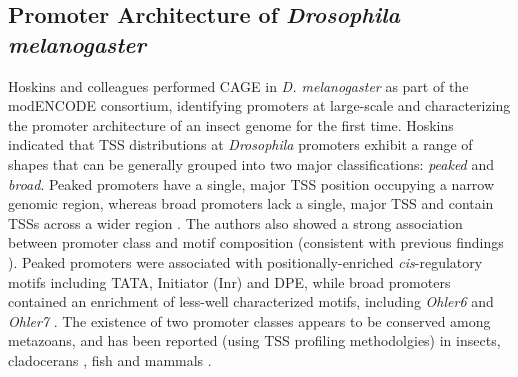 \documentclass[runningheads,a4paper]{llncs}
\begin{document}
\begin{linenumbers}
\subsection{Promoter Architecture of \textit{Drosophila melanogaster}}
Hoskins and colleagues \cite{Hoskins:2011io} performed CAGE in \textit{D. melanogaster} as part of the modENCODE consortium, identifying promoters at large-scale and characterizing the promoter architecture of an insect genome for the first time.
Hoskins \cite{Hoskins:2011io} indicated that TSS distributions at \textit{Drosophila} promoters exhibit a range of shapes that can be generally grouped into two major classifications: \textit{peaked} and \textit{broad}. 
Peaked promoters have a single, major TSS position occupying a narrow genomic region, whereas broad promoters lack a single, major TSS and contain TSSs across a wider region \cite{Rach:2009ct,Lenhard:2012en}. 
The authors also showed a strong association between promoter class and motif composition (consistent with previous findings \cite{Rach:2009ct,Ni:2010jh}). 
Peaked promoters were associated with positionally-enriched \textit{cis}-regulatory motifs including TATA, Initiator (Inr) and DPE, while broad promoters contained an enrichment of less-well characterized motifs, including \textit{Ohler6} and \textit{Ohler7} \cite{Ohler:2002vl}. 
The existence of two promoter classes appears to be conserved among metazoans, and has been reported (using TSS profiling methodolgies) in insects, cladocerans \cite{Raborn:2016cr}, fish \cite{Nepal:2013bga} and mammals \cite{Carninci:2006in,Lenhard:2012en}.


\end{linenumbers}
\end{document}
